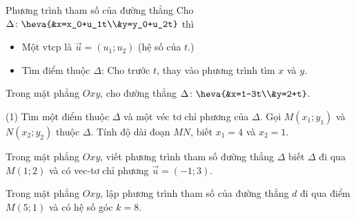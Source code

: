 \begin{dang}{Phương trình tham số của đường thẳng}
	 Cho $\Delta \colon \heva{&x=x_0+u_1t\\&y=y_0+u_2t}$ thì
	\begin{itemize}
		\item [$\bullet$] Một vtcp là $\overrightarrow{u}=(u_1;u_2)$ (hệ số của $t$.)
		\item [$\bullet$] Tìm điểm thuộc $\Delta$: Cho trước $t$, thay vào phương trình tìm $x$ và $y$.
	\end{itemize}

\end{dang}
\begin{vd}
	Trong mặt phẳng $Oxy$, cho đường thẳng $\Delta \colon \heva{&x=1-3t\\&y=2+t}$.
	\begin{tasks}(1)
		\task Tìm một điểm thuộc $\Delta$ và một véc tơ chỉ phương của $\Delta$.
		\task Gọi $M(x_1;y_1)$ và $N(x_2;y_2)$ thuộc $\Delta$. Tính độ dài đoạn $MN$, biết $x_1=4$ và $x_2=1$.
	\end{tasks}
	
\end{vd}
\begin{vd}
	Trong mặt phẳng $Oxy$, viết phương trình tham số đường thẳng $\Delta$ biết $\Delta$ đi qua $M(1;2)$ và có vec-tơ chỉ phương $ \overrightarrow{u} = (-1;3)$.
\end{vd}

\begin{vd}
	Trong mặt phẳng $Oxy$, lập phương trình tham số của đường thẳng $d $ đi qua điểm $M(5;1)$ và có hệ số góc $k=8.$ 
\end{vd}

